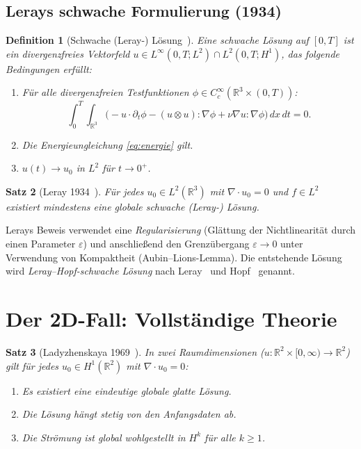 \documentclass[12pt,a4paper]{article}
\newtheorem{theorem}{Satz}[section]
\newtheorem{definition}[theorem]{Definition}
\theoremstyle{remark}
\begin{document}
\subsection{Lerays schwache Formulierung (1934)}

\begin{definition}[Schwache (Leray-) Lösung~\cite{Leray1934}]
  Eine \emph{schwache Lösung} auf $[0,T]$ ist ein divergenzfreies Vektorfeld
  $u \in L^\infty(0,T; L^2) \cap L^2(0,T; H^1)$, das folgende Bedingungen erfüllt:
  \begin{enumerate}[nosep]
    \item Für alle divergenzfreien Testfunktionen $\phi \in C_c^\infty(\mathbb{R}^3 \times (0,T))$:
    \[
      \int_0^T\!\int_{\mathbb{R}^3} \!\bigl(-u \cdot \partial_t \phi
      - (u\otimes u):\nabla\phi + \nu \nabla u : \nabla\phi\bigr)\,dx\,dt = 0.
    \]
    \item Die Energieungleichung \eqref{eq:energie} gilt.
    \item $u(t) \to u_0$ in $L^2$ für $t \to 0^+$.
  \end{enumerate}
\end{definition}

\begin{theorem}[Leray 1934~\cite{Leray1934}]
  Für jedes $u_0 \in L^2(\mathbb{R}^3)$ mit $\nabla \cdot u_0 = 0$ und $f \in L^2$
  existiert mindestens eine globale schwache (Leray-) Lösung.
\end{theorem}

Lerays Beweis verwendet eine \emph{Regularisierung} (Glättung der Nichtlinearität durch
einen Parameter $\varepsilon$) und anschließend den Grenzübergang $\varepsilon \to 0$
unter Verwendung von Kompaktheit (Aubin--Lions-Lemma). Die entstehende Lösung wird
\emph{Leray--Hopf-schwache Lösung} nach Leray~\cite{Leray1934} und Hopf~\cite{Hopf1951}
genannt.

\section{Der 2D-Fall: Vollständige Theorie}

\begin{theorem}[Ladyzhenskaya 1969~\cite{Lady1969}]
  In zwei Raumdimensionen ($u\colon \mathbb{R}^2 \times [0,\infty) \to \mathbb{R}^2$)
  gilt für jedes $u_0 \in H^1(\mathbb{R}^2)$ mit $\nabla \cdot u_0 = 0$:
  \begin{enumerate}[nosep]
    \item Es existiert eine eindeutige globale glatte Lösung.
    \item Die Lösung hängt stetig von den Anfangsdaten ab.
    \item Die Strömung ist global wohlgestellt in $H^k$ für alle $k \geq 1$.
  \end{enumerate}
\end{theorem}
\end{document}
